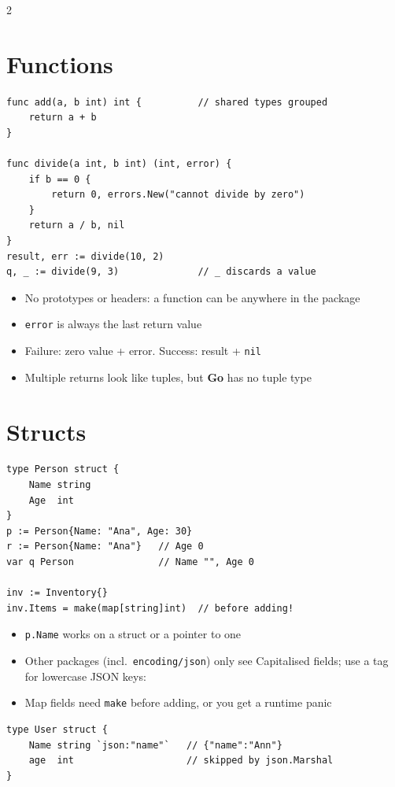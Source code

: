 \documentclass[9pt]{extarticle}
\newcommand{\Go}{\textbf{\textcolor{goblue}{Go}}}
\newcommand{\kw}[1]{\textcolor{accent}{\texttt{#1}}}
\begin{document}
\begin{multicols*}{2}
\section{Functions}
\begin{lstlisting}
func add(a, b int) int {          // shared types grouped
    return a + b
}

func divide(a int, b int) (int, error) {
    if b == 0 {
        return 0, errors.New("cannot divide by zero")
    }
    return a / b, nil
}
result, err := divide(10, 2)
q, _ := divide(9, 3)              // _ discards a value
\end{lstlisting}
\begin{itemize}
  \item No prototypes or headers: a function can be anywhere in the package
  \item \kw{error} is always the last return value
  \item Failure: zero value + error. Success: result + \kw{nil}
  \item Multiple returns look like tuples, but \Go{} has no tuple type
\end{itemize}

\section{Structs}
\begin{lstlisting}
type Person struct {
    Name string
    Age  int
}
p := Person{Name: "Ana", Age: 30}
r := Person{Name: "Ana"}   // Age 0
var q Person               // Name "", Age 0

inv := Inventory{}
inv.Items = make(map[string]int)  // before adding!
\end{lstlisting}
\begin{itemize}
  \item \kw{p.Name} works on a struct or a pointer to one
  \item Other packages (incl.\ \kw{encoding/json}) only see Capitalised fields; use a tag for lowercase JSON keys:
  \item Map fields need \kw{make} before adding, or you get a runtime panic
\end{itemize}
\begin{lstlisting}
type User struct {
    Name string `json:"name"`   // {"name":"Ann"}
    age  int                    // skipped by json.Marshal
}
\end{lstlisting}


\end{multicols*}
\end{document}
